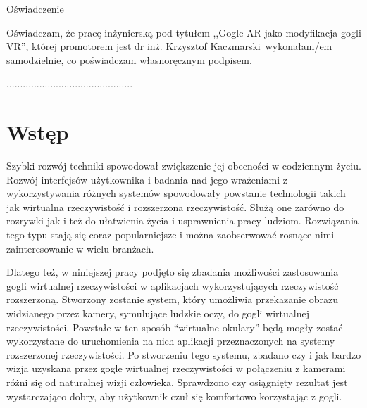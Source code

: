 \documentclass[a4paper,11pt,twoside]{report}
\theoremstyle{definition}
\newcommand{\tytul}{Gogle AR jako modyfikacja gogli VR}
\renewcommand{\title}{AR googles as modified VR googles}
\newcommand{\type}{inżyniers} %
\newcommand{\supervisor}{dr inż. Krzysztof Kaczmarski}
\begin{document}
\begin{center}
Oświadczenie %
\end{center}

\indent Oświadczam, że pracę \type ką pod
tytułem ,,\tytul '', której promotorem jest \supervisor \ wykonałam/em
samodzielnie, co poświadczam własnoręcznym podpisem.
\vspace{2cm}



\begin{flushright}
  \begin{minipage}{50mm}
    \begin{center}
      ..............................................

    \end{center}
  \end{minipage}
\end{flushright}

\thispagestyle{empty}
\newpage

\null\thispagestyle{empty}\newpage

\tableofcontents
\thispagestyle{empty}
\newpage
\null\thispagestyle{empty}\newpage
\setcounter{page}{11}
\pagestyle{fancy}


\chapter*{Wstęp} %

Szybki rozwój techniki spowodował zwiększenie jej obecności w codziennym życiu. Rozwój interfejsów użytkownika i badania nad jego wrażeniami z wykorzystywania różnych systemów spowodowały powstanie technologii takich jak wirtualna rzeczywistość i rozszerzona rzeczywistość. Służą one zarówno do rozrywki jak i też do ułatwienia życia i usprawnienia pracy ludziom. Rozwiązania tego typu stają się coraz popularniejsze i można zaobserwować rosnące nimi zainteresowanie w wielu branżach.

Dlatego też, w niniejszej pracy podjęto się zbadania możliwości zastosowania gogli wirtualnej rzeczywistości w aplikacjach wykorzystujących rzeczywistość rozszerzoną. Stworzony zostanie system, który umożliwia przekazanie obrazu widzianego przez kamery, symulujące ludzkie oczy, do gogli wirtualnej rzeczywistości. Powstałe w ten sposób ``wirtualne okulary'' będą mogły zostać wykorzystane do uruchomienia na nich aplikacji przeznaczonych na systemy rozszerzonej rzeczywistości.
Po stworzeniu tego systemu, zbadano czy i jak bardzo wizja uzyskana przez gogle wirtualnej rzeczywistości w połączeniu z kamerami różni się od naturalnej wizji człowieka. Sprawdzono czy osiągnięty rezultat jest wystarczająco dobry, aby użytkownik czuł się komfortowo korzystając z gogli.
\end{document}
